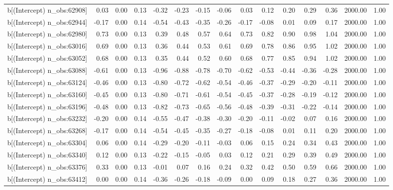 \begin{table}[ht]
\begin{tabular}{rrrrrrrrrrrrrrr}
  b[(Intercept) n\_obs:62908] & 0.03 & 0.00 & 0.13 & -0.32 & -0.23 & -0.15 & -0.06 & 0.03 & 0.12 & 0.20 & 0.29 & 0.36 & 2000.00 & 1.00 \\ 
  b[(Intercept) n\_obs:62944] & -0.17 & 0.00 & 0.14 & -0.54 & -0.43 & -0.35 & -0.26 & -0.17 & -0.08 & 0.01 & 0.09 & 0.17 & 2000.00 & 1.00 \\ 
  b[(Intercept) n\_obs:62980] & 0.73 & 0.00 & 0.13 & 0.39 & 0.48 & 0.57 & 0.64 & 0.73 & 0.82 & 0.90 & 0.98 & 1.04 & 2000.00 & 1.00 \\ 
  b[(Intercept) n\_obs:63016] & 0.69 & 0.00 & 0.13 & 0.36 & 0.44 & 0.53 & 0.61 & 0.69 & 0.78 & 0.86 & 0.95 & 1.02 & 2000.00 & 1.00 \\ 
  b[(Intercept) n\_obs:63052] & 0.68 & 0.00 & 0.13 & 0.35 & 0.44 & 0.52 & 0.60 & 0.68 & 0.77 & 0.85 & 0.94 & 1.02 & 2000.00 & 1.00 \\ 
  b[(Intercept) n\_obs:63088] & -0.61 & 0.00 & 0.13 & -0.96 & -0.88 & -0.78 & -0.70 & -0.62 & -0.53 & -0.44 & -0.36 & -0.28 & 2000.00 & 1.00 \\ 
  b[(Intercept) n\_obs:63124] & -0.46 & 0.00 & 0.13 & -0.80 & -0.72 & -0.62 & -0.54 & -0.46 & -0.37 & -0.29 & -0.20 & -0.11 & 2000.00 & 1.00 \\ 
  b[(Intercept) n\_obs:63160] & -0.45 & 0.00 & 0.13 & -0.80 & -0.71 & -0.61 & -0.54 & -0.45 & -0.37 & -0.28 & -0.19 & -0.12 & 2000.00 & 1.00 \\ 
  b[(Intercept) n\_obs:63196] & -0.48 & 0.00 & 0.13 & -0.82 & -0.73 & -0.65 & -0.56 & -0.48 & -0.39 & -0.31 & -0.22 & -0.14 & 2000.00 & 1.00 \\ 
  b[(Intercept) n\_obs:63232] & -0.20 & 0.00 & 0.14 & -0.55 & -0.47 & -0.38 & -0.30 & -0.20 & -0.11 & -0.02 & 0.07 & 0.16 & 2000.00 & 1.00 \\ 
  b[(Intercept) n\_obs:63268] & -0.17 & 0.00 & 0.14 & -0.54 & -0.45 & -0.35 & -0.27 & -0.18 & -0.08 & 0.01 & 0.11 & 0.20 & 2000.00 & 1.00 \\ 
  b[(Intercept) n\_obs:63304] & 0.06 & 0.00 & 0.14 & -0.29 & -0.20 & -0.11 & -0.03 & 0.06 & 0.15 & 0.24 & 0.34 & 0.43 & 2000.00 & 1.00 \\ 
  b[(Intercept) n\_obs:63340] & 0.12 & 0.00 & 0.13 & -0.22 & -0.15 & -0.05 & 0.03 & 0.12 & 0.21 & 0.29 & 0.39 & 0.49 & 2000.00 & 1.00 \\ 
  b[(Intercept) n\_obs:63376] & 0.33 & 0.00 & 0.13 & -0.01 & 0.07 & 0.16 & 0.24 & 0.32 & 0.42 & 0.50 & 0.59 & 0.66 & 2000.00 & 1.00 \\ 
  b[(Intercept) n\_obs:63412] & 0.00 & 0.00 & 0.14 & -0.36 & -0.26 & -0.18 & -0.09 & 0.00 & 0.09 & 0.18 & 0.27 & 0.36 & 2000.00 & 1.00 \\ 

\end{tabular}
\end{table}
